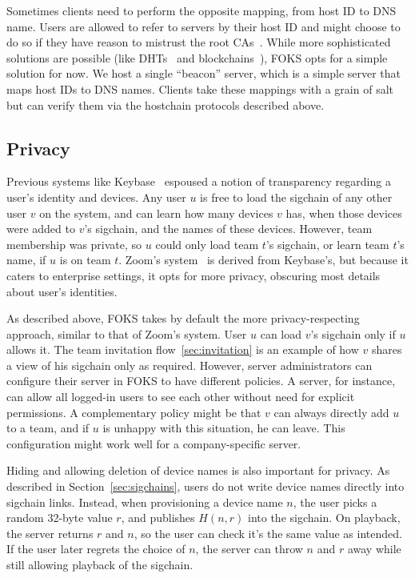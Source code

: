 Sometimes clients need to perform the opposite mapping, from host ID
to DNS name. Users are allowed to refer to servers by their host ID
and might choose to do so if they have reason to mistrust the 
root CAs~\cite{diginotar}. While more sophisticated solutions are possible
(like DHTs~\cite{chord} and blockchains~\cite{bitcoin}), FOKS opts for a simple
solution for now. We host a single ``beacon'' server, which is a simple
server that maps host IDs to DNS names. Clients take these mappings
with a grain of salt but can verify them via the hostchain protocols
described above.

\subsection{Privacy}
\label{sec:sigchain-viz}

Previous systems like Keybase~\cite{keybase} espoused a notion of transparency
regarding a user's identity and devices. Any user $u$ is free to load the 
sigchain of any other user $v$ on the system, and can learn how many devices $v$
has, when those devices were added to $v$'s sigchain, and the names of these
devices. However, team membership was private, so $u$ could only load team $t$'s
sigchain, or learn team $t$'s name, if $u$ is on team $t$.  Zoom's
system~\cite{zoom-privacy} is derived from Keybase's, but because it caters to
enterprise settings, it opts for more privacy, obscuring most details about user's
identities.

As described above, FOKS takes by default the more privacy-respecting
approach, similar to that of Zoom's system. User $u$ can load $v$'s sigchain
only if $u$ allows it. The team invitation flow~\ref{sec:invitation} is an
example of how $v$ shares a view of his sigchain only as required.  However,
server administrators can configure their server in FOKS to have different
policies.  A server, for instance, can allow all logged-in users to see each
other without need for explicit permissions. A complementary policy might be
that $v$ can always directly add $u$ to a team, and if $u$ is unhappy with this
situation, he can leave. This configuration might work well for a
company-specific server.

Hiding and allowing deletion of device names is also important for privacy. As
described in Section~\ref{sec:sigchains}, users do not write device names
directly into sigchain links.  Instead, when provisioning a device name $n$, the
user picks a random 32-byte value $r$, and publishes $H(n, r)$ into the
sigchain. On playback, the server returns $r$ and $n$, so the user can check
it's the same value as intended. If the user later regrets the choice of $n$,
the server can throw $n$ and $r$ away while still allowing playback of the
sigchain.
